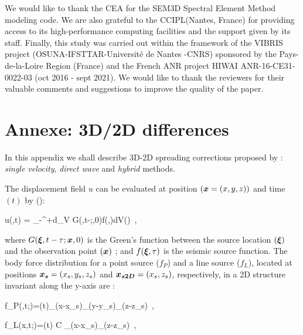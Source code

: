 \documentclass[extra,mreferee]{gji}
\begin{document}
\begin{acknowledgments}
We would like to thank the CEA for the SEM3D Spectral Element Method modeling code. We are also grateful to the CCIPL(Nantes, France) for providing access to its high-performance computing facilities and the support given  by its staff. Finally, this study was carried out within the framework of the VIBRIS project (OSUNA-IFSTTAR-Universit\'e de Nantes -CNRS) sponsored by the Pays-de-la-Loire Region (France) and the French ANR project HIWAI ANR-16-CE31-0022-03 (oct 2016 - sept 2021).
We would like to thank the reviewers for their valuable comments and suggestions to improve the quality of the paper.
\end{acknowledgments}

\clearpage
\newpage




\clearpage
\newpage

\section*{Annexe: 3D/2D differences}

In this appendix we shall describe 3D-2D spreading corrections proposed by \cite{Forbriger_LSS_2014}: \textit{single velocity}, \textit{direct wave} and \textit{hybrid} methods.

The displacement field $u$ can be evaluated at position $(\mitbf{x}=(x,y,z))$ and time $(t)$ by (\cite{aki2002quantitative}):

\equation
u(,t) = \int_{-\infty}^{+\infty}d\tau \int \int \int_{V} G(\mitbf{\xi},t-\tau;,0)f(\mitbf{\xi},\tau)dV(\mitbf{\xi})\ ,
\label{eq:displacement}
\endequation

where $G(\mitbf{\xi},t-\tau;\mitbf{x},0)$ is the Green's function between the source location $(\mitbf{\xi})$ and the observation point $(\mitbf{x})$ ; and $f(\mitbf{\xi},\tau)$ is the seismic source function. The body force distribution for a point source ($f_{P}$) and a line source ($f_{L}$), located at positions $ \mitbf{x_{s}}=(x_{s}, y_{s},z_{s}) $ and $ \mitbf{x_{s2D}}=(x_{s},z_{s}) $, respectively, in a 2D structure invariant along the y-axis are :

\equation
f_{P}(,t;)=(t)\delta_{}(x-x_{s})\delta_{}(y-y_{s})\delta_{}(z-z_{s})\ , \label{eq:point-force}
\endequation

\equation
f_{L}(x,t;)=(t) C \delta_{}(x-x_{s})\delta_{}(z-z_{s})\ , 
\label{eq:line-force}
\endequation
\end{document}
